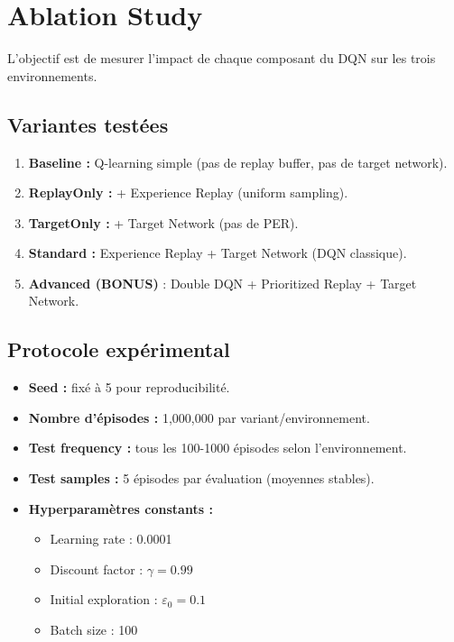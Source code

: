 \documentclass[12pt,a4paper]{article}
\begin{document}
\section{Ablation Study}

L'objectif est de mesurer l'impact de chaque composant du DQN sur les trois environnements.

\subsection{Variantes testées}

\begin{enumerate}
    \item \textbf{Baseline :} Q-learning simple (pas de replay buffer, pas de target network).
    \item \textbf{ReplayOnly :} + Experience Replay (uniform sampling).
    \item \textbf{TargetOnly :} + Target Network (pas de PER).
    \item \textbf{Standard :} Experience Replay + Target Network (DQN classique).
    \item \textbf{Advanced (BONUS)} : Double DQN + Prioritized Replay + Target Network.
\end{enumerate}

\subsection{Protocole expérimental}

\begin{itemize}
    \item \textbf{Seed :} fixé à 5 pour reproducibilité.
    \item \textbf{Nombre d'épisodes :} 1,000,000 par variant/environnement.
    \item \textbf{Test frequency :} tous les 100-1000 épisodes selon l'environnement.
    \item \textbf{Test samples :} 5 épisodes par évaluation (moyennes stables).
    \item \textbf{Hyperparamètres constants :}
    \begin{itemize}
        \item Learning rate : 0.0001
        \item Discount factor : $\gamma = 0.99$
        \item Initial exploration : $\varepsilon_0 = 0.1$
        \item Batch size : 100
    \end{itemize}
\end{itemize}
\end{document}
